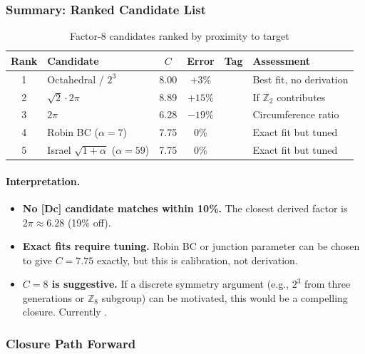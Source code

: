 \subsubsection{Summary: Ranked Candidate List}
\label{sec:ch11_factor8_ranking}

\begin{table}[ht]
\centering
\caption{Factor-8 candidates ranked by proximity to target}
\label{tab:ch11_factor8_ranking}
\small
\begin{tabular}{clcccl}
\toprule
\textbf{Rank} & \textbf{Candidate} & \textbf{$C$} & \textbf{Error} & \textbf{Tag} & \textbf{Assessment} \\
\midrule
1 & Octahedral / $2^3$ & 8.00 & $+3\%$ & \tagP{} & Best fit, no derivation \\
2 & $\sqrt{2} \cdot 2\pi$ & 8.89 & $+15\%$ & \tagP{} & If $\mathbb{Z}_2$ contributes \\
3 & $2\pi$ & 6.28 & $-19\%$ & \tagDc{} & Circumference ratio \\
4 & Robin BC ($\alpha = 7$) & 7.75 & $0\%$ & \tagP{} & Exact fit but tuned \\
5 & Israel $\sqrt{1+\alpha}$ ($\alpha=59$) & 7.75 & $0\%$ & \tagP{} & Exact fit but tuned \\
\bottomrule
\end{tabular}
\end{table}

\paragraph{Interpretation.}
\begin{itemize}[nosep]
    \item \textbf{No [Dc] candidate matches within 10\%.} The closest derived factor
          is $2\pi \approx 6.28$ (19\% off).
    \item \textbf{Exact fits require tuning.} Robin BC or junction parameter can
          be chosen to give $C = 7.75$ exactly, but this is calibration, not derivation.
    \item \textbf{$C = 8$ is suggestive.} If a discrete symmetry argument
          (e.g., $2^3$ from three generations or $\mathbb{Z}_8$ subgroup) can be
          motivated, this would be a compelling closure. Currently \tagP{}.
\end{itemize}

\subsubsection{Closure Path Forward}
\label{sec:ch11_factor8_closure_path}

